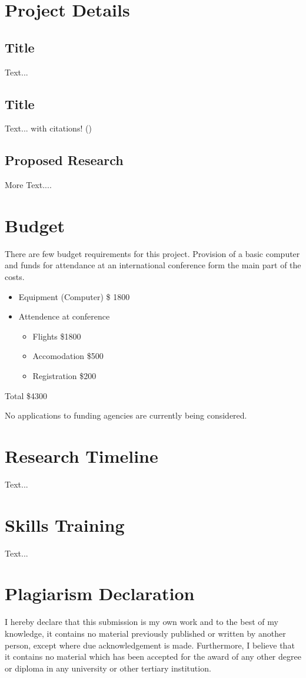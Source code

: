 \documentclass[a4paper]{article}
\theoremstyle{remark}
\begin{document}
\section{Project Details}
\subsection{Title}
Text...

\subsection{Title}
Text... with citations! (\cite{Reference1})

\subsection{Proposed Research}
More Text....

\section{Budget}
There are few budget requirements for this project. Provision of a basic computer and funds for attendance at an international conference form the main part of the costs.
\begin{itemize}
	\item Equipment (Computer)	\$ 1800
	\item Attendence at conference
	\begin{itemize}
		\item Flights \$1800
		\item Accomodation \$500
		\item Registration \$200
	\end{itemize}
\end{itemize}

Total \$4300

No applications to funding agencies are currently being considered.
\section{Research Timeline}

Text...

\section{Skills Training}
Text...

\section{Plagiarism Declaration}
I hereby declare that this submission is my own work and to the best of my knowledge, it contains no material previously published or written by another person, except where due acknowledgement is made. Furthermore, I believe that it contains no material which has been accepted for the award of any other degree or diploma in any university or other tertiary institution.



\end{document}
